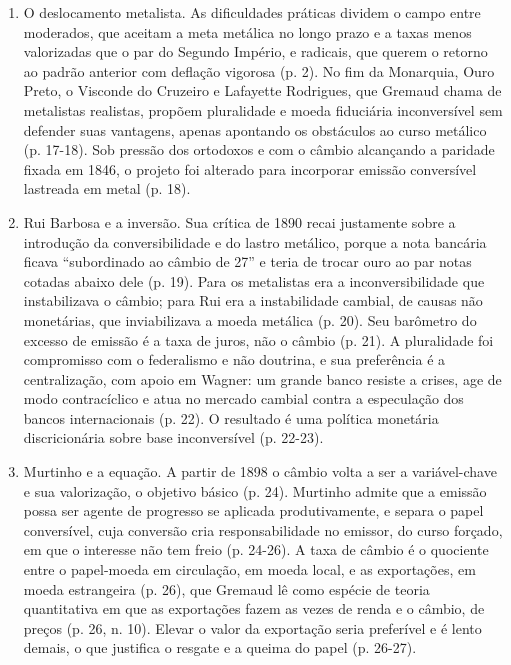 \begin{enumerate}[leftmargin=*,nosep]
\item O deslocamento metalista. As dificuldades práticas dividem o campo entre
moderados, que aceitam a meta metálica no longo prazo e a taxas menos
valorizadas que o par do Segundo Império, e radicais, que querem o retorno ao
padrão anterior com deflação vigorosa (p. 2). No fim da Monarquia, Ouro Preto,
o Visconde do Cruzeiro e Lafayette Rodrigues, que Gremaud chama de metalistas
realistas, propõem pluralidade e moeda fiduciária inconversível sem defender
suas vantagens, apenas apontando os obstáculos ao curso metálico (p. 17-18). Sob
pressão dos ortodoxos e com o câmbio alcançando a paridade fixada em 1846, o
projeto foi alterado para incorporar emissão conversível lastreada em metal
(p. 18).

\item Rui Barbosa e a inversão. Sua crítica de 1890 recai justamente sobre a
introdução da conversibilidade e do lastro metálico, porque a nota bancária
ficava ``subordinado ao câmbio de 27'' e teria de trocar ouro ao par notas
cotadas abaixo dele (p. 19). Para os metalistas era a inconversibilidade que
instabilizava o câmbio; para Rui era a instabilidade cambial, de causas não
monetárias, que inviabilizava a moeda metálica (p. 20). Seu barômetro do
excesso de emissão é a taxa de juros, não o câmbio (p. 21). A pluralidade foi
compromisso com o federalismo e não doutrina, e sua preferência é a
centralização, com apoio em Wagner: um grande banco resiste a crises, age de
modo contracíclico e atua no mercado cambial contra a especulação dos bancos
internacionais (p. 22). O resultado é uma política monetária discricionária
sobre base inconversível (p. 22-23).

\item Murtinho e a equação. A partir de 1898 o câmbio volta a ser a
variável-chave e sua valorização, o objetivo básico (p. 24). Murtinho admite que
a emissão possa ser agente de progresso se aplicada produtivamente, e separa o
papel conversível, cuja conversão cria responsabilidade no emissor, do curso
forçado, em que o interesse não tem freio (p. 24-26). A taxa de câmbio é o
quociente entre o papel-moeda em circulação, em moeda local, e as exportações,
em moeda estrangeira (p. 26), que Gremaud lê como espécie de teoria quantitativa
em que as exportações fazem as vezes de renda e o câmbio, de preços (p. 26,
n. 10). Elevar o valor da exportação seria preferível e é lento demais, o que
justifica o resgate e a queima do papel (p. 26-27).


\end{enumerate}
